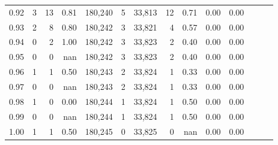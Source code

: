 \begin{tabular}{rrrrrrrrrrrrrr}
0.92 &      3 &   13 &  0.81 &  180,240 &        5 &  33,813 &      12 &  0.71 &  0.00 &      0.00 \\
0.93 &      2 &    8 &  0.80 &  180,242 &        3 &  33,821 &       4 &  0.57 &  0.00 &      0.00 \\
0.94 &      0 &    2 &  1.00 &  180,242 &        3 &  33,823 &       2 &  0.40 &  0.00 &      0.00 \\
0.95 &      0 &    0 &   nan &  180,242 &        3 &  33,823 &       2 &  0.40 &  0.00 &      0.00 \\
0.96 &      1 &    1 &  0.50 &  180,243 &        2 &  33,824 &       1 &  0.33 &  0.00 &      0.00 \\
0.97 &      0 &    0 &   nan &  180,243 &        2 &  33,824 &       1 &  0.33 &  0.00 &      0.00 \\
0.98 &      1 &    0 &  0.00 &  180,244 &        1 &  33,824 &       1 &  0.50 &  0.00 &      0.00 \\
0.99 &      0 &    0 &   nan &  180,244 &        1 &  33,824 &       1 &  0.50 &  0.00 &      0.00 \\
1.00 &      1 &    1 &  0.50 &  180,245 &        0 &  33,825 &       0 &   nan &  0.00 &      0.00 \\
\bottomrule
\end{tabular}
